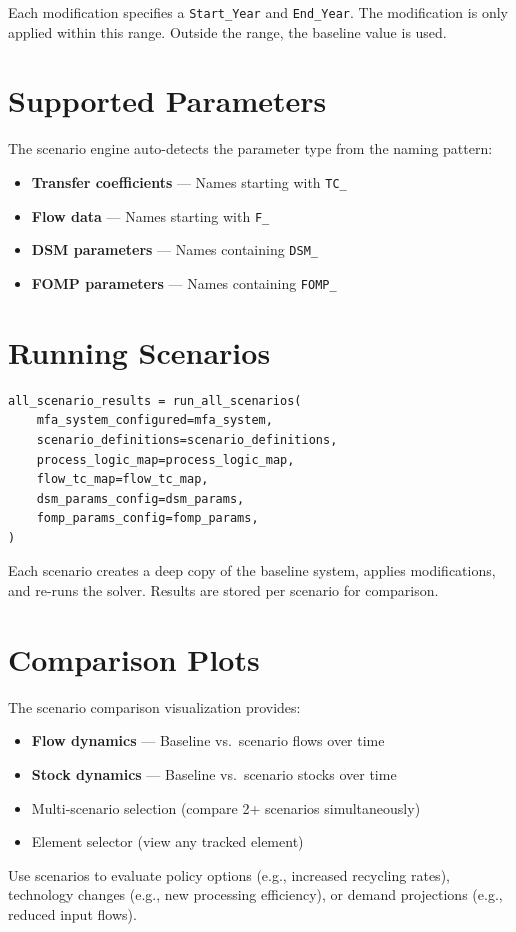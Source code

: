 Each modification specifies a \texttt{Start\_Year} and \texttt{End\_Year}. The modification is only applied within this range. Outside the range, the baseline value is used.

\section{Supported Parameters}

The scenario engine auto-detects the parameter type from the naming pattern:

\begin{itemize}
  \item \textbf{Transfer coefficients} --- Names starting with \texttt{TC\_}
  \item \textbf{Flow data} --- Names starting with \texttt{F\_}
  \item \textbf{DSM parameters} --- Names containing \texttt{DSM\_}
  \item \textbf{FOMP parameters} --- Names containing \texttt{FOMP\_}
\end{itemize}

\section{Running Scenarios}

\begin{lstlisting}[style=python]
all_scenario_results = run_all_scenarios(
    mfa_system_configured=mfa_system,
    scenario_definitions=scenario_definitions,
    process_logic_map=process_logic_map,
    flow_tc_map=flow_tc_map,
    dsm_params_config=dsm_params,
    fomp_params_config=fomp_params,
)
\end{lstlisting}

Each scenario creates a deep copy of the baseline system, applies modifications, and re-runs the solver. Results are stored per scenario for comparison.

\section{Comparison Plots}

The scenario comparison visualization provides:
\begin{itemize}
  \item \textbf{Flow dynamics} --- Baseline vs.\ scenario flows over time
  \item \textbf{Stock dynamics} --- Baseline vs.\ scenario stocks over time
  \item Multi-scenario selection (compare 2+ scenarios simultaneously)
  \item Element selector (view any tracked element)
\end{itemize}

\begin{tipbox}
Use scenarios to evaluate policy options (e.g., increased recycling rates), technology changes (e.g., new processing efficiency), or demand projections (e.g., reduced input flows).
\end{tipbox}
